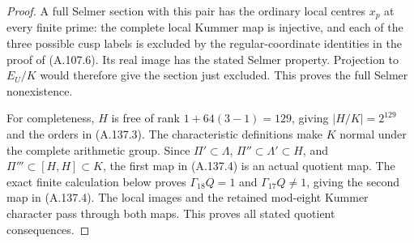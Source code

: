 \begin{proof}
A full Selmer section with this pair has the
ordinary local centres \(x_p\) at every finite
prime: the complete local Kummer map is injective,
and each of the three possible cusp labels is
excluded by the regular-coordinate identities in
the proof of (A.107.6).
Its real image has the stated Selmer property.
Projection to \(E_U/K\) would therefore give the
section just excluded.
This proves the full Selmer nonexistence.

For completeness, \(H\) is free of rank
\(1+64(3-1)=129\), giving \(|H/K|=2^{129}\)
and the orders in (A.137.3).
The characteristic definitions make \(K\)
normal under the complete arithmetic group.
Since \(\Pi'\subset\Lambda\),
\(\Pi''\subset\Lambda'\subset H\), and
\(\Pi'''\subset[H,H]\subset K\), the first
map in (A.137.4) is an actual quotient map.
The exact finite calculation below proves
$\Gamma_{18}Q=1$ and $\Gamma_{17}Q\ne1$, giving
the second map in (A.137.4).
The local images and the retained mod-eight
Kummer character pass through both maps.
This proves all stated quotient consequences.


\end{proof}
